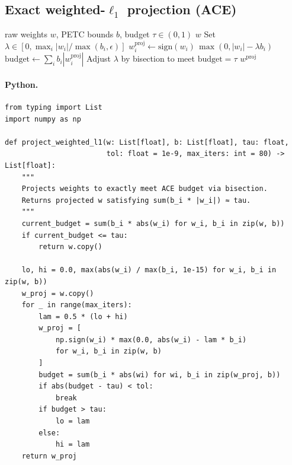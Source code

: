 \documentclass[11pt]{article}
\theoremstyle{plain}
\theoremstyle{definition}
\theoremstyle{remark}
\begin{document}
\subsection{Exact weighted-$\ell_1$ projection (ACE)}
\begin{algorithm}[H]
\caption{Weighted-$\ell_1$ projection by bisection}
\begin{algorithmic}[1]
\Require raw weights $w$, PETC bounds $b$, budget $\tau\in(0,1)$
 \State \Return $w$ \EndIf
\State Set $\lambda\in[0,\max_i |w_i|/\max(b_i,\epsilon)]$
  \State $w^{\mathrm{proj}}_i \leftarrow \mathrm{sign}(w_i)\,\max(0, |w_i|-\lambda b_i)$
  \State $\mathrm{budget}\leftarrow \sum_i b_i |w^{\mathrm{proj}}_i|$
  \State Adjust $\lambda$ by bisection to meet $\mathrm{budget}=\tau$
\EndWhile
\State \Return $w^{\mathrm{proj}}$
\end{algorithmic}
\end{algorithm}

\paragraph{Python.}
\begin{lstlisting}[style=py,caption={Exact weighted-$\ell_1$ projection (ACE budget)}]
from typing import List
import numpy as np

def project_weighted_l1(w: List[float], b: List[float], tau: float, 
                        tol: float = 1e-9, max_iters: int = 80) -> List[float]:
    """
    Projects weights to exactly meet ACE budget via bisection.
    Returns projected w satisfying sum(b_i * |w_i|) ≈ tau.
    """
    current_budget = sum(b_i * abs(w_i) for w_i, b_i in zip(w, b))
    if current_budget <= tau:
        return w.copy()

    lo, hi = 0.0, max(abs(w_i) / max(b_i, 1e-15) for w_i, b_i in zip(w, b))
    w_proj = w.copy()
    for _ in range(max_iters):
        lam = 0.5 * (lo + hi)
        w_proj = [
            np.sign(w_i) * max(0.0, abs(w_i) - lam * b_i)
            for w_i, b_i in zip(w, b)
        ]
        budget = sum(b_i * abs(wi) for wi, b_i in zip(w_proj, b))
        if abs(budget - tau) < tol:
            break
        if budget > tau:
            lo = lam
        else:
            hi = lam
    return w_proj
\end{lstlisting}
\end{document}
